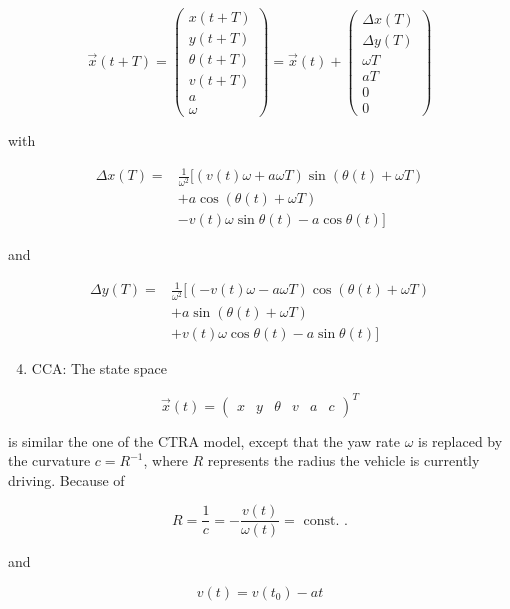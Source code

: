 $$
\vec{x}(t+T)=\left(\begin{array}{c}
	x(t+T) \\
	y(t+T) \\
	\theta(t+T) \\
	v(t+T) \\
	a \\
	\omega
\end{array}\right)=\vec{x}(t)+\left(\begin{array}{c}
	\Delta x(T) \\
	\Delta y(T) \\
	\omega T \\
	a T \\
	0 \\
	0
\end{array}\right)
$$

with

$$
\begin{aligned}
	\Delta x(T)= & \frac{1}{\omega^{2}}[(v(t) \omega+a \omega T) \sin (\theta(t)+\omega T) \\
	& +a \cos (\theta(t)+\omega T) \\
	& -v(t) \omega \sin \theta(t)-a \cos \theta(t)]
\end{aligned}
$$

and

$$
\begin{aligned}
	\Delta y(T)= & \frac{1}{\omega^{2}}[(-v(t) \omega-a \omega T) \cos (\theta(t)+\omega T) \\
	& +a \sin (\theta(t)+\omega T) \\
	& +v(t) \omega \cos \theta(t)-a \sin \theta(t)]
\end{aligned}
$$

\begin{enumerate}
	\setcounter{enumi}{3}
	\item CCA: The state space
\end{enumerate}

$$
\vec{x}(t)=\left(\begin{array}{cccccc}
	x & y & \theta & v & a & c
\end{array}\right)^{T}
$$

is similar the one of the CTRA model, except that the yaw rate $\omega$ is replaced by the curvature $c=R^{-1}$, where $R$ represents the radius the vehicle is currently driving. Because of

$$
R=\frac{1}{c}=-\frac{v(t)}{\omega(t)}=\text { const. } .
$$

and

$$
v(t)=v\left(t_{0}\right)-a t
$$

